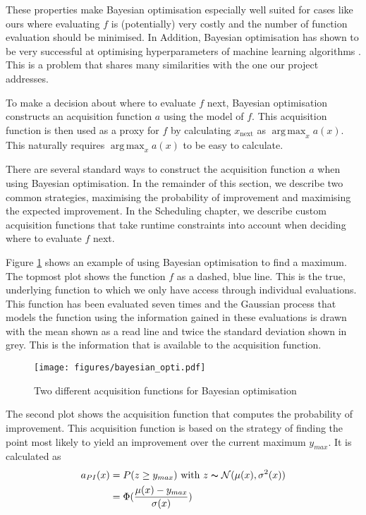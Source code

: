 \documentclass[a4paper,12pt,twoside,openright]{report}
\DeclareMathOperator*{\argmax}{arg\,max}
\begin{document}
These properties make Bayesian optimisation especially well suited for cases like ours where evaluating $f$ is (potentially) very costly and the number of function evaluation should be minimised. In Addition, Bayesian optimisation has shown to be very successful at optimising hyperparameters of machine learning algorithms \cite{PracticalBayesianOptimization}. This is a problem that shares many similarities with the one our project addresses.

To make a decision about where to evaluate $f$ next, Bayesian optimisation constructs an acquisition function $a$ using the model of $f$. This acquisition function is then used as a proxy for $f$ by calculating $x_{\text{next}}$ as $\argmax_x a(x)$. This naturally requires $\argmax_x a(x)$ to be easy to calculate.

There are several standard ways to construct the acquisition function $a$ when using Bayesian optimisation. In the remainder of this section, we describe two common strategies, maximising the probability of improvement and maximising the expected improvement. In the Scheduling chapter, we describe custom acquisition functions that take runtime constraints into account when deciding where to evaluate $f$ next.

Figure \ref{bayesianopti} shows an example of using Bayesian optimisation to find a maximum. The topmost plot shows the function $f$ as a dashed, blue line. This is the true, underlying function to which we only have access through individual evaluations. This function has been evaluated seven times and the Gaussian process that models the function using the information gained in these evaluations is drawn with the mean shown as a read line and twice the standard deviation shown in grey. This is the information that is available to the acquisition function.

\begin{figure}
\centering
  \texttt{[image: figures/bayesian\_opti.pdf]}
  \caption{Two different acquisition functions for Bayesian optimisation}
  \label{bayesianopti}
\end{figure}

The second plot shows the acquisition function that computes the probability of improvement. This acquisition function is based on the strategy of finding the point most likely to yield an improvement over the current maximum $y_{max}$. It is calculated as
\begin{align}
a_{PI}(x) &= P(z \geq y_{max}) \text{\ with\ } z \thicksim \mathcal{N}(\mu(x),\sigma^2(x))\label{eq:pi_equation}\\
&=\Phi(\frac{\mu(x) - y_{max}}{\sigma(x)})
\end{align}
\end{document}
